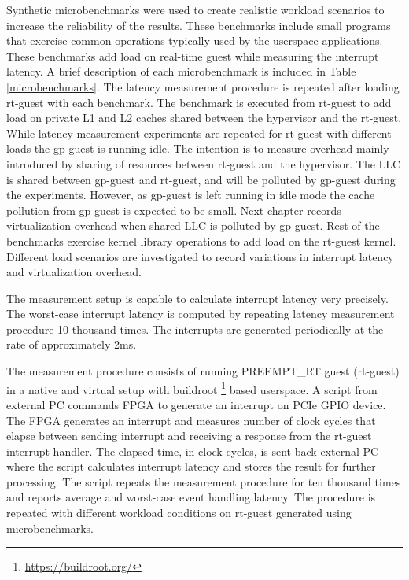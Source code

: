 Synthetic microbenchmarks were used to create realistic workload scenarios to increase the reliability of the results. 
These benchmarks include small programs that exercise common operations typically used by the userspace applications.
These benchmarks add load on real-time guest while measuring the interrupt latency.
A brief description of each microbenchmark is included in Table \ref{microbenchmarks}.
The latency measurement procedure is repeated after loading rt-guest with each benchmark.
The \mcachepressure{} benchmark is executed from rt-guest to add load on private L1 and L2 caches
shared between the hypervisor and the rt-guest.
While latency measurement experiments are repeated for rt-guest with different loads the gp-guest 
is running idle. 
The intention is to measure overhead mainly introduced by sharing of resources between rt-guest and the hypervisor.
The LLC is shared between gp-guest and rt-guest, and will be polluted by gp-guest during the experiments.
However, as gp-guest is left running in idle mode the cache pollution from gp-guest is expected to be small.
Next chapter records virtualization overhead when shared LLC is polluted by gp-guest.
Rest of the benchmarks exercise kernel library operations to add load on the rt-guest kernel.
Different load scenarios are investigated to record variations in interrupt latency and virtualization overhead.


The measurement setup is capable to calculate interrupt latency very precisely.
The worst-case interrupt latency is computed by repeating latency measurement procedure 
10 thousand times. The interrupts are generated periodically at the rate of approximately 2ms.

The measurement procedure consists of running PREEMPT\_RT guest (rt-guest) in a native and virtual setup with buildroot \footnote{\url{https://buildroot.org/}} based userspace.
A script from external PC commands FPGA to generate an interrupt on PCIe GPIO device.
The FPGA generates an interrupt and measures number of clock cycles that elapse between sending interrupt and receiving
a response from the rt-guest interrupt handler. The elapsed time, in clock cycles, is sent back external PC
where the script calculates interrupt latency and stores the result for further processing.
The script repeats the measurement procedure for ten thousand times
and reports average and worst-case event handling latency. 
The procedure is repeated with different workload conditions on rt-guest generated using microbenchmarks.


